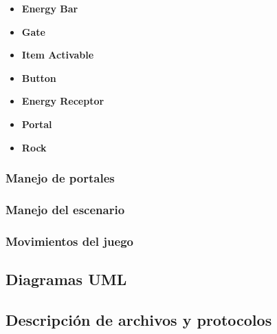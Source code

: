 \documentclass[a4paper]{article}
\begin{document}
\begin{itemize}
	\item \textbf{Energy Bar}
\end{itemize}


\begin{itemize}
	\item \textbf{Gate}
\end{itemize}


\begin{itemize}
	\item \textbf{Item Activable}
\end{itemize}


\begin{itemize}
	\item \textbf{Button}
\end{itemize}

\begin{itemize}
	\item \textbf{Energy Receptor}
\end{itemize}


\begin{itemize}
	\item \textbf{Portal}
\end{itemize}


\begin{itemize}
	\item \textbf{Rock}
\end{itemize}

\subsubsection{Manejo de portales}

\subsubsection{Manejo del escenario}

\subsubsection{Movimientos del juego}

\subsection{Diagramas UML}

\subsection{Descripción de archivos y protocolos}
\end{document}
